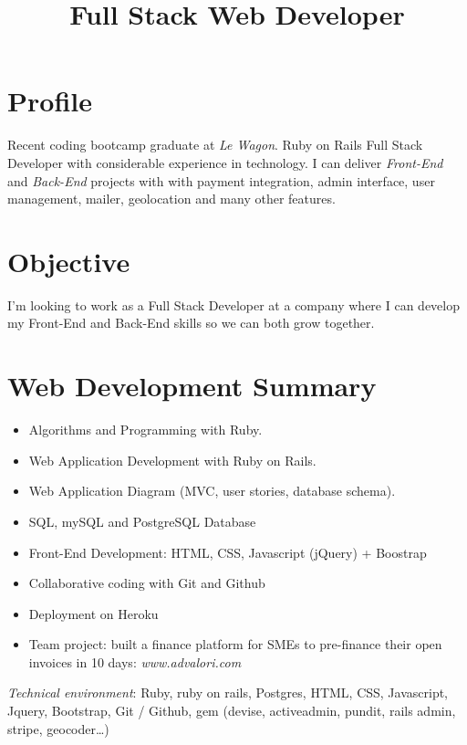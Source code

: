 \documentclass[11pt,a4paper]{moderncv}
\title{Full Stack Web Developer}
\newcommand{\pl}[1]{\textit{\color{plblue} #1}}
\begin{document}
\maketitle

\section{Profile}
Recent coding bootcamp graduate at \pl{Le Wagon}. Ruby on Rails Full Stack Developer with considerable experience in technology. I can deliver \pl{Front-End} and \pl{Back-End} projects with with payment integration, admin interface, user management, mailer, geolocation and many other features.

\section{Objective}
I'm looking to work as a Full Stack Developer at a company where I can develop my Front-End and Back-End skills so we can both grow together.

\section{Web Development Summary}
\begin{itemize}
\item Algorithms and Programming with Ruby.
\item Web Application Development with Ruby on Rails.
\item Web Application Diagram (MVC, user stories, database schema).
\item SQL, mySQL and PostgreSQL Database
\item Front-End Development: HTML, CSS, Javascript (jQuery) + Boostrap
\item Collaborative coding with Git and Github
\item Deployment on Heroku
\item Team project: built a finance platform for SMEs to pre-finance their open invoices in 10 days: \pl{www.advalori.com}
\end{itemize}

\pl{Technical environment}: Ruby, ruby on rails, Postgres, HTML, CSS, Javascript, Jquery, Bootstrap, Git / Github, gem (devise, activeadmin, pundit, rails admin, stripe, geocoder…)
\end{document}
